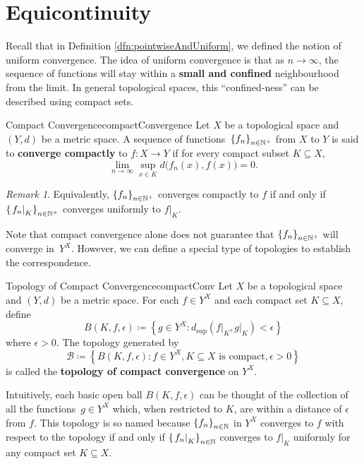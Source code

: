 \documentclass[math]{amznotes}
\theoremstyle{remark}
\newtheorem*{remark}{Remark}
\begin{document}
\section{Equicontinuity}
Recall that in Definition \ref{dfn:pointwiseAndUniform}, we defined the notion of uniform convergence. The idea of uniform convergence is that as $n \to \infty$, the sequence of functions will stay within a \textbf{small and confined} neighbourhood from the limit. In general topological spaces, this ``confined-ness'' can be described using compact sets.
\begin{dfnbox}{Compact Convergence}{compactConvergence}
    Let $X$ be a topological space and $\left(Y, d\right)$ be a metric space. A sequence of functions~$\left\{f_n\right\}_{n \in \mathbb{N}^+}$ from $X$ to $Y$ is said to {\color{red} \textbf{converge compactly}} to $f \colon X \to Y$ if for every compact subset $K \subseteq X$, 
    \begin{equation*}   
        \lim_{n \to \infty}\sup_{x \in K}d\bigl(f_n\left(x\right), f\left(x\right)\bigr) = 0.
    \end{equation*} 
\end{dfnbox}
\begin{notebox}
    \begin{remark}
        Equivalently, $\left\{f_n\right\}_{n \in \mathbb{N}^+}$ converges compactly to $f$ if and only if $\left\{\left.f_n\right\rvert_K\right\}_{n \in \mathbb{N}^+}$ converges uniformly to $\left.f\right\rvert_K$.
    \end{remark}
\end{notebox}
Note that compact convergence alone does not guarantee that $\left\{f_n\right\}_{n \in \mathbb{N}^+}$ will converge in~$Y^X$. However, we can define a special type of topologies to establish the correspondence.
\begin{dfnbox}{Topology of Compact Convergence}{compactConv}
    Let $X$ be a topological space and $\left(Y, d\right)$ be a metric space. For each $f \in Y^X$ and each compact set $K \subseteq X$, define 
    \begin{equation*}
        B\left(K, f, \epsilon\right) \coloneqq \left\{g \in Y^X \colon d_{\sup}\left(\left.f\right\rvert_K, \left.g\right\rvert_K\right) < \epsilon\right\}
    \end{equation*}
    where $\epsilon > 0$. The topology generated by
    \begin{equation*}
        \mathcal{B} \coloneqq \left\{B\left(K, f, \epsilon\right) \colon f \in Y^X, K \subseteq X \textrm{ is compact}, \epsilon > 0\right\}
    \end{equation*} 
    is called the {\color{red} \textbf{topology of compact convergence}} on $Y^X$.
\end{dfnbox}
Intuitively, each basic open ball $B\left(K, f, \epsilon\right)$ can be thought of the collection of all the functions~$g \in Y^X$ which, when restricted to $K$, are within a distance of $\epsilon$ from $f$. This topology is so named because $\left\{f_n\right\}_{n \in \mathbb{N}}$ in $Y^X$ converges to $f$ with respect to the topology if and only if $\left\{\left. f_n \right\rvert_K\right\}_{n \in \mathbb{N}}$ converges to $\left. f\right\rvert_K$ uniformly for any compact set $K \subseteq X$. 
\end{document}
